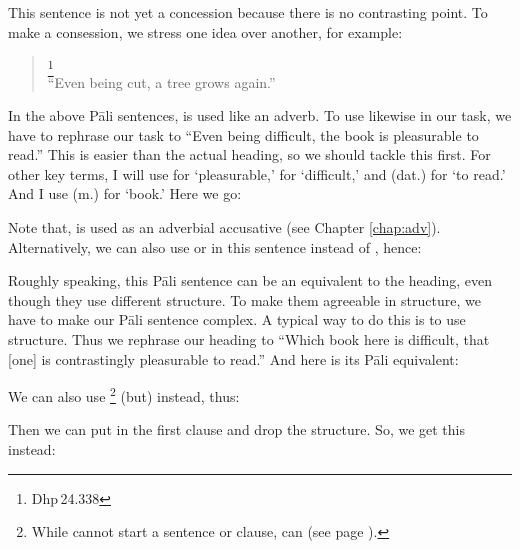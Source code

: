 This sentence is not yet a concession because there is no contrasting point. To make a consession, we stress one idea over another, for example:

\begin{quote}
\footnote{Dhp\,24.338}\\
``Even being cut, a tree grows again.''\\
\end{quote}

In the above P\=ali sentences,  is used like an adverb. To use  likewise in our task, we have to rephrase our task to ``Even being difficult, the book is pleasurable to read.'' This is easier than the actual heading, so we should tackle this first. For other key terms, I will use  for `pleasurable,'  for `difficult,' and  (dat.) for `to read.' And I use  (m.) for `book.' Here we go:


Note that,  is used as an adverbial accusative (see Chapter \ref{chap:adv}). Alternatively, we can also use  or  in this sentence instead of , hence:


Roughly speaking, this P\=ali sentence can be an equivalent to the heading, even though they use different structure. To make them agreeable in structure, we have to make our P\=ali sentence complex. A typical way to do this is to use  structure. Thus we rephrase our heading to ``Which book here is difficult, that [one] is contrastingly pleasurable to read.'' And here is its P\=ali equivalent:


We can also use \footnote{While  cannot start a sentence or clause,  can (see page \pageref{nip:api}).} (but) instead, thus:


Then we can put  in the first clause and drop the  structure. So, we get this instead:

